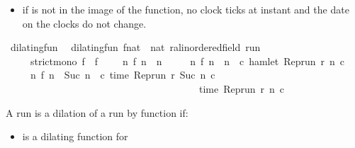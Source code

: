 \begin{isabellebody}
\begin{isamarkuptext}
\begin{itemize}
\item if  is not in the image of the function, no clock ticks at 
instant  and the date on the clocks do not change.%
\end{itemize}%
\end{isamarkuptext}\isamarkuptrue%
\isamarkupfalse%
\ dilating{\isacharunderscore}fun\isanewline
{}\isanewline
\ \ {\isacartoucheopen}dilating{\isacharunderscore}fun\ {\isacharparenleft}f{\isacharcolon}{\isacharcolon}nat\ {\isasymRightarrow}\ nat{\isacharparenright}\ {\isacharparenleft}r{\isacharcolon}{\isacharcolon}{\isacharprime}a{\isacharcolon}{\isacharcolon}linordered{\isacharunderscore}field\ run{\isacharparenright}\isanewline
\ \ \ \ {\isasymequiv}\ strict{\isacharunderscore}mono\ f\ {\isasymand}\ {\isacharparenleft}f\ {}\ {\isacharequal}\ {}{\isacharparenright}\ {\isasymand}\ {\isacharparenleft}{\isasymforall}n{\isachardot}\ f\ n\ {\isasymge}\ n\isanewline
\ \ \ \ {\isasymand}\ {\isacharparenleft}{\isacharparenleft}{\isasymnexists}n\ f\ n\ {\isacharequal}\ n{\isacharparenright}\ {\isasymlongrightarrow}\ {\isacharparenleft}{\isasymforall}c{\isachardot}\ {\isasymnot}{\isacharparenleft}hamlet\ {\isacharparenleft}{\isacharparenleft}Rep{\isacharunderscore}run\ r{\isacharparenright}\ n\ c{\isacharparenright}{\isacharparenright}{\isacharparenright}{\isacharparenright}\isanewline
\ \ \ \ {\isasymand}\ {\isacharparenleft}{\isacharparenleft}{\isasymnexists}n\ f\ n\ {\isacharequal}\ {\isacharparenleft}Suc\ n{\isacharparenright}{\isacharparenright}\ {\isasymlongrightarrow}\ {\isacharparenleft}{\isasymforall}c{\isachardot}\ time\ {\isacharparenleft}{\isacharparenleft}Rep{\isacharunderscore}run\ r{\isacharparenright}\ {\isacharparenleft}Suc\ n{\isacharparenright}\ c{\isacharparenright}\isanewline
\ \ \ \ \ \ \ \ \ \ \ \ \ \ \ \ \ \ \ \ \ \ \ \ \ \ \ \ \ \ \ \ \ \ \ \ \ \ {\isacharequal}\ time\ {\isacharparenleft}{\isacharparenleft}Rep{\isacharunderscore}run\ r{\isacharparenright}\ n\ c{\isacharparenright}{\isacharparenright}{\isacharparenright}\isanewline
\ \ \ {\isacharparenright}{\isacartoucheclose}%
\begin{isamarkuptext}%
A run  is a dilation of a run  by 
function  if:

%
\begin{itemize}%
\item {} is a dilating function for  


\end{itemize}
\end{isamarkuptext}
\end{isabellebody}

